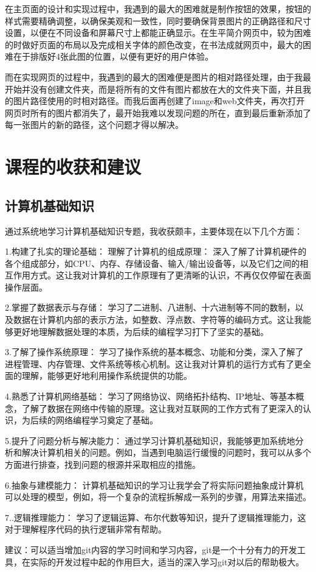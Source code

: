 \documentclass[supercite]{Experimental_Report}
\theoremstyle{definition}
\begin{document}
在主页面的设计和实现过程中，我遇到的最大的困难就是制作按钮的效果，按钮的样式需要精确调整，以确保美观和一致性，同时要确保背景图片的正确路径和尺寸设置，以便在不同设备和屏幕尺寸上都能正确显示。在生平简介网页中，较为困难的时做好页面的布局以及完成相关字体的颜色改变，在书法成就网页中，最大的困难在于排版好4张此图的位置，以便有更好的用户体验。
\par 而在实现网页的过程中，我遇到的最大的困难便是图片的相对路径处理，由于我最开始并没有创建文件夹，而是将所有的文件有图片都放在大的文件夹下面，并且我的图片路径使用的时相对路径。而我后面再创建了image和web文件夹，再次打开网页时所有的图片都消失了，最开始我难以发现问题的所在，直到最后重新添加了每一张图片的新的路径，这个问题才得以解决。

\newpage

\section{课程的收获和建议}


\subsection{计算机基础知识}
通过系统地学习计算机基础知识专题，我收获颇丰，主要体现在以下几个方面：

\par 1.构建了扎实的理论基础：
理解了计算机的组成原理： 深入了解了计算机硬件的各个组成部分，如CPU、内存、存储设备、输入/输出设备等，以及它们之间的相互作用方式。这让我对计算机的工作原理有了更清晰的认识，不再仅仅停留在表面操作层面。
\par 2.掌握了数据表示与存储： 学习了二进制、八进制、十六进制等不同的数制，以及数据在计算机内部的表示方法，如整数、浮点数、字符等的编码方式。这让我能够更好地理解数据处理的本质，为后续的编程学习打下了坚实的基础。
\par 3.了解了操作系统原理： 学习了操作系统的基本概念、功能和分类，深入了解了进程管理、内存管理、文件系统等核心机制。这让我对计算机的运行方式有了更全面的理解，能够更好地利用操作系统提供的功能。
\par 4.熟悉了计算机网络基础： 学习了网络协议、网络拓扑结构、IP地址、等基本概念，了解了数据在网络中传输的原理。这让我对互联网的工作方式有了更深入的认识，为后续的网络编程学习奠定了基础。
\par 5.提升了问题分析与解决能力： 通过学习计算机基础知识，我能够更加系统地分析和解决计算机相关的问题。例如，当遇到电脑运行缓慢的问题时，我可以从多个方面进行排查，找到问题的根源并采取相应的措施。
\par 6.抽象与建模能力： 计算机基础知识的学习让我学会了将实际问题抽象成计算机可以处理的模型，例如，将一个复杂的流程拆解成一系列的步骤，用算法来描述。
\par 7..逻辑推理能力： 学习了逻辑运算、布尔代数等知识，提升了逻辑推理能力，这对于理解程序代码的执行逻辑非常有帮助。
\par 建议：可以适当增加git内容的学习时间和学习内容，git是一个十分有力的开发工具，在实际的开发过程中起的作用巨大，适当的深入学习git对以后的帮助极大。
\end{document}
